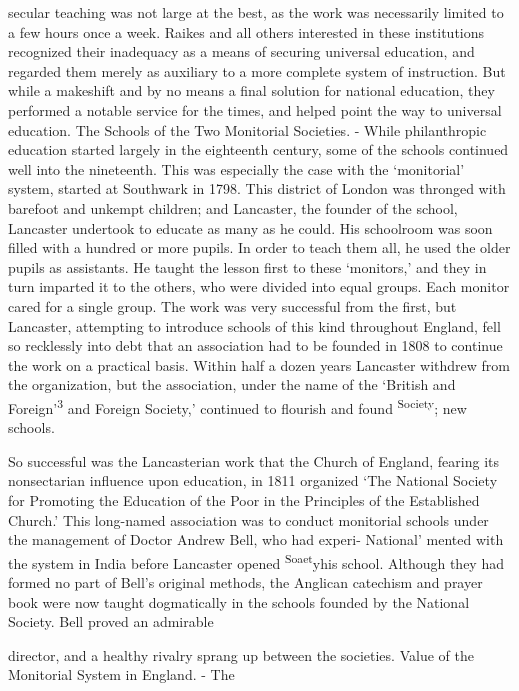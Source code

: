 \documentclass[
]{book}
\begin{document}
secular teaching was not large at the best, as the work was necessarily limited to a few hours once a week. Raikes and all others interested in these institutions recognized their inadequacy as a means of securing universal education, and regarded them merely as auxiliary to a more complete system of instruction. But while a makeshift and by no means a final solution for national education, they performed a notable service for the times, and helped point the way to universal education. The Schools of the Two Monitorial Societies. - While philanthropic education started largely in the eighteenth\protect\hypertarget{ch20.xmlux5cux23para.298.1.0.box.143.247.1249.1065.q.60}{}{ century, some of the schools continued well into the nineteenth. This was especially the case with the `monitorial' system, started at Southwark in 1798. This district of London was thronged with barefoot and unkempt children; and Lancaster, the founder of the school, Lancaster undertook to educate as many as he could. His schoolroom was soon filled with a hundred or more pupils. In order to teach them all, he used the older pupils as assistants. He taught the lesson first to these `monitors,' and they in turn imparted it to the others, who were divided into equal groups. Each monitor cared for a single group. The work was very successful from the first, but Lancaster, attempting to introduce schools of this kind throughout England, fell so recklessly into debt that an association had to be founded in 1808 to continue the work on a practical basis. Within half a dozen years Lancaster withdrew from the organization, but the association, under the name of the `British and Foreign'\textsuperscript{3} and Foreign Society,' continued to flourish and found \textsuperscript{Society}; new schools.}

So successful was the Lancasterian work that the Church of England, fearing its nonsectarian influence upon education, in 1811 organized `The National Society for Promoting the Education of the Poor in the Principles of the Established Church.' This long-named association was to conduct monitorial schools under the management of Doctor Andrew Bell, who had experi- National' mented with the system in India before Lancaster opened \textsuperscript{Soaet}yhis school. Although they had formed no part of Bell's original methods, the Anglican catechism and prayer book were now taught dogmatically in the schools founded by the National Society. Bell proved an admirable

director, and a healthy rivalry sprang up between the societies. Value of the Monitorial System in England. - The
\end{document}
